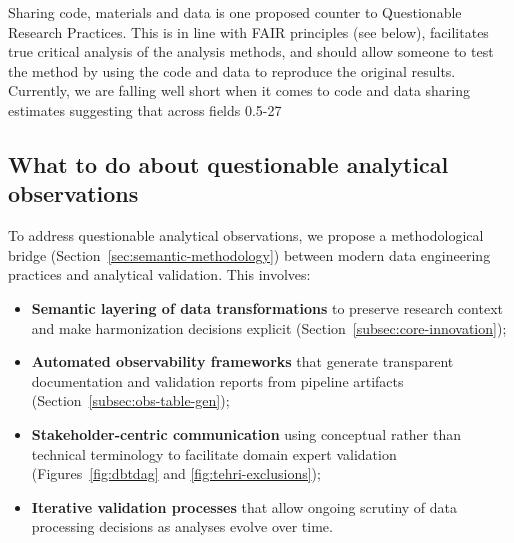\documentclass{article}
\begin{document}
Sharing code, materials and data is one proposed counter to Questionable Research Practices. This is in line with FAIR principles (see below), facilitates true critical analysis of the analysis methods, and should allow someone to test the method by using the code and data to reproduce the original results. Currently, we are falling well short when it comes to code and data sharing estimates suggesting that across fields 0.5-27%

\subsection{What to do about questionable analytical observations}

To address questionable analytical observations, we propose a methodological bridge (Section~\ref{sec:semantic-methodology}) between modern data engineering practices and analytical validation. This involves:
\begin{itemize}
    \item \textbf{Semantic layering of data transformations} to preserve research context and make harmonization decisions explicit (Section~\ref{subsec:core-innovation});
    \item \textbf{Automated observability frameworks} that generate transparent documentation and validation reports from pipeline artifacts (Section~\ref{subsec:obs-table-gen});
    \item \textbf{Stakeholder-centric communication} using conceptual rather than technical terminology to facilitate domain expert validation (Figures~\ref{fig:dbtdag} and \ref{fig:tehri-exclusions});
    \item \textbf{Iterative validation processes} that allow ongoing scrutiny of data processing decisions as analyses evolve over time.
\end{itemize}
\end{document}
